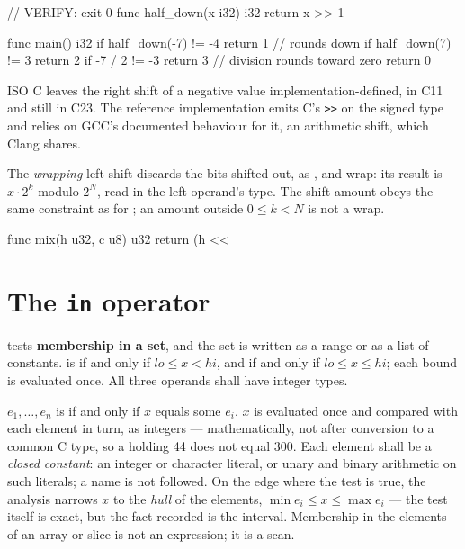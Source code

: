 \begin{example}
\begin{laincode}
// VERIFY: exit 0
func half_down(x i32) i32 {
    return x >> 1
}

func main() i32 {
    if half_down(-7) != -4 { return 1 }    // rounds down
    if half_down(7) != 3 { return 2 }
    if -7 / 2 != -3 { return 3 }           // division rounds toward zero
    return 0
}
\end{laincode}
\end{example}

\begin{note}
  ISO C leaves the right shift of a negative value implementation-defined, in C11 and still in
  C23.  The reference implementation emits C's \texttt{>>} on the signed type and relies on GCC's
  documented behaviour for it, an arithmetic shift, which Clang shares.
\end{note}

\pnum
The \emph{wrapping} left shift  discards the bits shifted out, as \lain{+\%},
\lain{-\%} and \lain{*\%} wrap: its result is \(x \cdot 2^k\) modulo \(2^N\), read in the left
operand's type.  The shift amount obeys the same constraint as for \lain{<<}; an amount outside
\(0 \leq k < N\) is not a wrap.

\begin{example}
\begin{laincode}
func mix(h u32, c u8) u32 {
    return (h <<%
}
\end{laincode}
\end{example}

\section{The \texttt{in} operator}
\label{sec:expr.in}

\pnum
{} tests \textbf{membership in a set}, and the set is written as a range or as a list of
constants.   is  if and only if \(\mathit{lo} \leq x < \mathit{hi}\),
and  if and only if \(\mathit{lo} \leq x \leq \mathit{hi}\); each bound is
evaluated once.  All three operands shall have integer types.

\pnum
\lain{x in [}\(e_1, \ldots, e_n\)\lain{]} is  if and only if \(x\) equals some \(e_i\).
\(x\) is evaluated once and compared with each element in turn, as integers --- mathematically, not
after conversion to a common C type, so a  holding 44 does not equal 300.  Each element
shall be a \emph{closed constant}: an integer or character literal, or unary and binary arithmetic on
such literals; a name is not followed.  On the edge where the test is true, the analysis narrows
\(x\) to the \emph{hull} of the elements, \(\min e_i \leq x \leq \max e_i\) --- the test itself is
exact, but the fact recorded is the interval.  Membership in the elements of an array or slice is
not an  expression; it is a scan.

